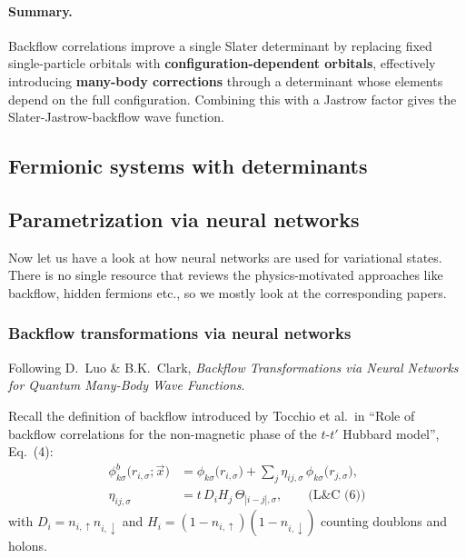\documentclass[../../main.tex]{subfiles}
\begin{document}
\paragraph{Summary.}
Backflow correlations improve a single Slater determinant by replacing fixed
single-particle orbitals with \textbf{configuration-dependent orbitals},
effectively introducing \textbf{many-body corrections} through a determinant whose
elements depend on the full configuration. Combining this with a Jastrow factor
gives the Slater-Jastrow-backflow wave function.

\subsection{Fermionic systems with determinants}
\label{subsec:fermionic-systems-with-determinants}






\subsection{Parametrization via neural networks}

Now let us have a look at how neural networks are used for variational states.
There is no single resource that reviews the physics-motivated approaches like
backflow, hidden fermions etc., so we mostly look at the corresponding papers.

\subsubsection{Backflow transformations via neural networks}

Following D.\ Luo \& B.K.\ Clark, \emph{Backflow Transformations via Neural
Networks for Quantum Many-Body Wave Functions}.

Recall the definition of backflow introduced by Tocchio et al.\ in ``Role of
backflow correlations for the non-magnetic phase of the $t$-$t'$ Hubbard model'',
Eq.~(4):
\begin{align}
\phi^b_{k\sigma}\big(r_{i,\sigma};\vec x\big)
&=\phi_{k\sigma}\big(r_{i,\sigma}\big)+\sum_j \eta_{ij,\sigma}\,
\phi_{k\sigma}\big(r_{j,\sigma}\big),\\
\eta_{ij,\sigma}&=t\,D_i H_j\,\Theta_{|i-j|,\sigma}, \qquad \text{(L\&C (6))}
\end{align}
with $D_i=n_{i,\uparrow}n_{i,\downarrow}$ and
$H_i=(1-n_{i,\uparrow})(1-n_{i,\downarrow})$ counting doublons and holons.
\end{document}
